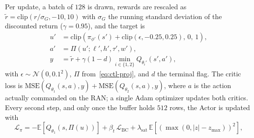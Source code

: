 Per update, a batch of $128$ is drawn, rewards are rescaled as $\tilde r=\mathrm{clip}(r/\sigma_G,-10,10)$ with $\sigma_G$ the running standard deviation of the discounted return ($\gamma=0.95$), and the target is
\begin{align}
u'&=\mathrm{clip}\!\left(\pi_{\phi'}(s')+\mathrm{clip}(\epsilon,-0.25,0.25),\,0,\,1\right),\nonumber\\
a'&=\Pi(u';\ell',h',\tau',w'),\nonumber\\
y&=\tilde r+\gamma(1-d)\min_{i\in\{1,2\}}Q_{\theta_i'}(s',a'),
\label{eq:ctl-target}
\end{align}
with $\epsilon\sim\mathcal{N}(0,0.1^2)$,
$\Pi$ from~\eqref{eq:ctl-proj}, and $d$ the terminal flag. The critic loss is $\mathrm{MSE}(Q_{\theta_1}(s,a),y)+\mathrm{MSE}(Q_{\theta_2}(s,a),y)$, where $a$ is the action actually commanded on the RAN; a single Adam optimizer updates both critics. Every second step, and only once the buffer holds $512$ rows, the Actor is updated with
\begin{equation}
\mathcal{L}_{\pi}=-\mathbb{E}\!\left[Q_{\theta_1}(s,\Pi(u))\right]+\beta_t\,\mathcal{L}_{\mathrm{BC}}+\lambda_{\mathrm{sat}}\,\mathbb{E}\!\left[\left(\max(0,|z|-z_{\max})\right)^2\right],
\label{eq:ctl-actor}
\end{equation}
